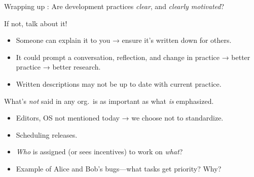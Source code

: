 \documentclass[12pt,aspectratio=169]{beamer}
\begin{document}
\begin{frame}{Wrapping up}
: Are development practices \emph{clear}, and \emph{clearly motivated}?

If not, talk about it!
\begin{itemize}
  \item Someone can explain it to you → ensure it's written down for others.
  \item It could prompt a conversation, reflection, and change in practice → better practice → better research.
  \item Written descriptions may not be up to date with current practice.
\end{itemize}

\bigskip
{}
What's \emph{not} said in any org.\ is as important as what \emph{is} emphasized.

\begin{itemize}
  \item Editors, OS not mentioned today → we choose not to standardize.
  \item Scheduling releases.
  \item \emph{Who} is assigned (or sees incentives) to work on \emph{what}?
  \item Example of Alice and Bob's bugs—what tasks get priority? Why?
\end{itemize}

\end{frame}

\begin{frame}[plain]

\centering \Huge {}

\end{frame}

\appendix
\end{document}
